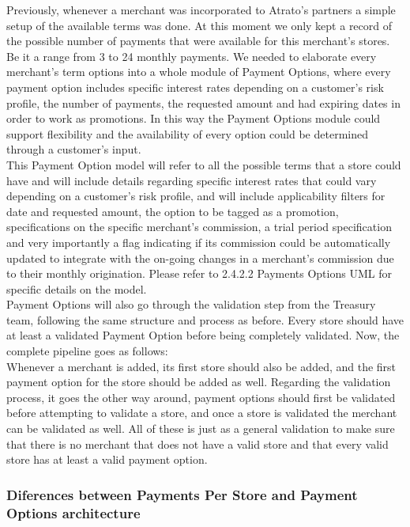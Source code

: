 Previously, whenever a merchant was incorporated to Atrato’s partners a simple setup of the available terms was done. At this moment we only kept a record of the possible number of payments that were available for this merchant’s stores. Be it a range from 3 to 24 monthly payments. We needed to elaborate every merchant’s term options into a whole module of Payment Options, where every payment option includes specific interest rates depending on a customer’s risk profile, the number of payments, the requested amount and had expiring dates in order to work as promotions. In this way the Payment Options module could support flexibility and the availability of every option could be determined through a customer’s input.\\

This Payment Option model will refer to all the possible terms that a store could have and will include details regarding specific interest rates that could vary depending on a customer’s risk profile, and will include applicability filters for date and requested amount, the option to be tagged as a promotion, specifications on the specific merchant’s commission, a trial period specification and very importantly a flag indicating if its commission could be automatically updated to integrate with the on-going changes in a merchant’s commission due to their monthly origination. Please refer to 2.4.2.2 Payments Options UML for specific details on the model.\\

Payment Options will also go through the validation step from the Treasury team, following the same structure and process as before. Every store should have at least a validated Payment Option before being completely validated. Now, the complete pipeline goes as follows:\\

Whenever a merchant is added, its first store should also be added, and the first payment option for the store should be added as well. Regarding the validation process, it goes the other way around, payment options should first be validated before attempting to validate a store, and once a store is validated the merchant can be validated as well. All of these is just as a general validation to make sure that there is no merchant that does not have a valid store and that every valid store has at least a valid payment option.

\subsubsection{Diferences between Payments Per Store and Payment Options architecture}

